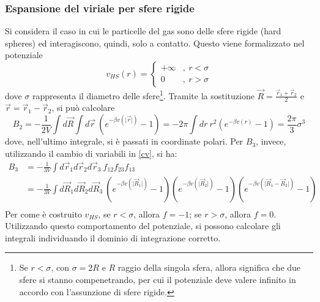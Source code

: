 \documentclass[11pt, a4paper]{scrartcl}
\theoremstyle{style}
\theoremstyle{style1}
\numberwithin{equation}{subsection}
\begin{document}
\subsubsection{Espansione del viriale per sfere rigide}
Si considera il caso in cui le particelle del gas sono delle sfere rigide (hard spheres) ed interagiscono, quindi, solo a contatto.
Questo viene formalizzato nel potenziale 
\[
v_{HS} (r) = \begin{cases}
	+\infty &,\ r< \sigma \\
	0 &,\ r> \sigma 
\end{cases}
\] 
dove $\sigma $ rappresenta il diametro delle sfere\footnote{Se $r<\sigma $, con $\sigma = 2R$ e $R$ raggio della singola sfera, allora significa che due sfere si stanno compenetrando, per cui il potenziale deve valere infinito in accordo con l'assunzione di sfere rigide.}.
Tramite la sostituzione $\vec{R} = \frac{\vec{r}_1 + \vec{r}_2}{2}$ e $\vec{r}= \vec{r}_1 - \vec{r}_2$, si pu\`o calcolare
\[
B_2 = - \frac{1}{2V}\int d\vec{R} \int d\vec{r} \ \left(e^{-\beta v(\lvert \vec{r} \rvert )}-1\right)  = -2 \pi \int dr \ r^2 \left(e^{-\beta v(r)}-1\right) = \frac{2\pi}{3}\sigma ^3
\] 
dove, nell'ultimo integrale, si \`e passati in coordinate polari.
Per $B_3$, invece, utilizzando il cambio di variabili in \ref{cv}, si ha:
\[
\begin{split}
	B_3 &= -\frac{1}{3V}\int d\vec{r}_1 d\vec{r}_2 d\vec{r}_3 \ f_{12}f_{23}f_{13}\\
	    &= -\frac{1}{3V}\int d\vec{R}_1 d\vec{R}_2 d\vec{R}_3\  \left(e^{-\beta v(\lvert \vec{R}_1 \rvert )}-1\right) \left(e^{-\beta v(\lvert \vec{R}_2 \rvert )}-1\right)\left(e^{-\beta v(\lvert \vec{R}_1 - \vec{R}_2\rvert )}-1\right)\\
\end{split}
\] 
Per come \`e costruito $v_{HS} $, se $r<\sigma $, allora $f=-1$; se $r>\sigma $, allora $f=0$. 
Utilizzando questo comportamento del potenziale, si possono calcolare gli integrali individuando il dominio di integrazione corretto.
\end{document}
